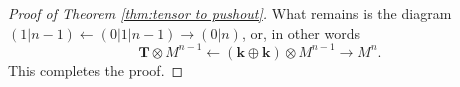 \documentclass{article}
\theoremstyle{definition}
\begin{document}
\begin{proof}[Proof of Theorem \ref{thm:tensor to pushout}]
    What remains is the diagram $(1|n-1) \leftarrow (0|1|n-1) \rightarrow (0|n)$, or, in other words
    $$\mathbf{T} \otimes M^{n-1} \leftarrow (\mathbf{k} \oplus \mathbf{k}) \otimes M^{n-1} \rightarrow M^n.$$
    This completes the proof.
\end{proof}
\newpage




\end{document}
